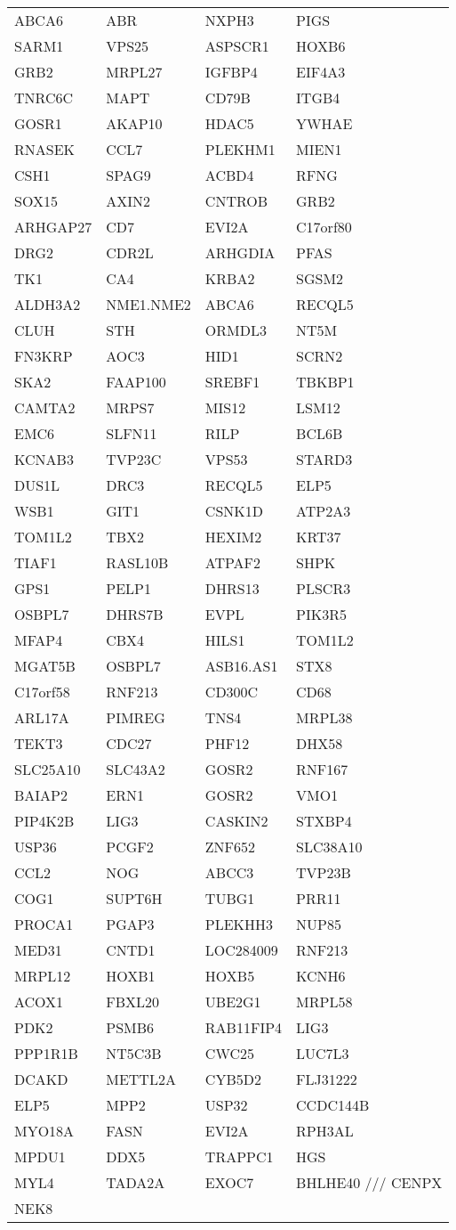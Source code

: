{\begin{longtable}{llll}
ABCA6&ABR&NXPH3&PIGS\tabularnewline
SARM1&VPS25&ASPSCR1&HOXB6\tabularnewline
GRB2&MRPL27&IGFBP4&EIF4A3\tabularnewline
TNRC6C&MAPT&CD79B&ITGB4\tabularnewline
GOSR1&AKAP10&HDAC5&YWHAE\tabularnewline
RNASEK&CCL7&PLEKHM1&MIEN1\tabularnewline
CSH1&SPAG9&ACBD4&RFNG\tabularnewline
SOX15&AXIN2&CNTROB&GRB2\tabularnewline
ARHGAP27&CD7&EVI2A&C17orf80\tabularnewline
DRG2&CDR2L&ARHGDIA&PFAS\tabularnewline
TK1&CA4&KRBA2&SGSM2\tabularnewline
ALDH3A2&NME1.NME2&ABCA6&RECQL5\tabularnewline
CLUH&STH&ORMDL3&NT5M\tabularnewline
FN3KRP&AOC3&HID1&SCRN2\tabularnewline
SKA2&FAAP100&SREBF1&TBKBP1\tabularnewline
CAMTA2&MRPS7&MIS12&LSM12\tabularnewline
EMC6&SLFN11&RILP&BCL6B\tabularnewline
KCNAB3&TVP23C&VPS53&STARD3\tabularnewline
DUS1L&DRC3&RECQL5&ELP5\tabularnewline
WSB1&GIT1&CSNK1D&ATP2A3\tabularnewline
TOM1L2&TBX2&HEXIM2&KRT37\tabularnewline
TIAF1&RASL10B&ATPAF2&SHPK\tabularnewline
GPS1&PELP1&DHRS13&PLSCR3\tabularnewline
OSBPL7&DHRS7B&EVPL&PIK3R5\tabularnewline
MFAP4&CBX4&HILS1&TOM1L2\tabularnewline
MGAT5B&OSBPL7&ASB16.AS1&STX8\tabularnewline
\newpage
C17orf58&RNF213&CD300C&CD68\tabularnewline
ARL17A&PIMREG&TNS4&MRPL38\tabularnewline
TEKT3&CDC27&PHF12&DHX58\tabularnewline
SLC25A10&SLC43A2&GOSR2&RNF167\tabularnewline
BAIAP2&ERN1&GOSR2&VMO1\tabularnewline
PIP4K2B&LIG3&CASKIN2&STXBP4\tabularnewline
USP36&PCGF2&ZNF652&SLC38A10\tabularnewline
CCL2&NOG&ABCC3&TVP23B\tabularnewline
COG1&SUPT6H&TUBG1&PRR11\tabularnewline
PROCA1&PGAP3&PLEKHH3&NUP85\tabularnewline
MED31&CNTD1&LOC284009&RNF213\tabularnewline
MRPL12&HOXB1&HOXB5&KCNH6\tabularnewline
ACOX1&FBXL20&UBE2G1&MRPL58\tabularnewline
PDK2&PSMB6&RAB11FIP4&LIG3\tabularnewline
PPP1R1B&NT5C3B&CWC25&LUC7L3\tabularnewline
DCAKD&METTL2A&CYB5D2&FLJ31222\tabularnewline
ELP5&MPP2&USP32&CCDC144B\tabularnewline
MYO18A&FASN&EVI2A&RPH3AL\tabularnewline
MPDU1&DDX5&TRAPPC1&HGS\tabularnewline
MYL4&TADA2A&EXOC7&BHLHE40 /// CENPX\tabularnewline
NEK8&&&\tabularnewline
\bottomrule
\end{longtable}}
\addtocounter{table}{-1}
